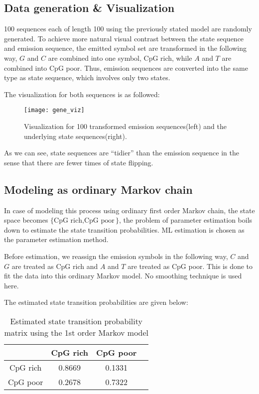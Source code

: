 \documentclass[paper=a4, fontsize=11pt]{scrartcl} %
\numberwithin{equation}{section} %
\numberwithin{figure}{section} %
\numberwithin{table}{section} %
\begin{document}
\subsection {Data generation \& Visualization}

100 sequences each of length 100 using the previously stated model are randomly generated. To achieve more natural visual contrast between the state sequence and emission sequence, the emitted symbol set are transformed in the following way, $G$ and $C$ are combined into one symbol, CpG rich, while $A$ and $T$ are combined into CpG poor. Thus, emission sequences are converted into the same type as state sequence, which involves only two states.

The visualization for both sequences is as followed:

\begin{figure}[H]
  \center
  \texttt{[image: gene\_viz]}
  \label{fig:5.gene_viz}
  \caption {Visualization for 100 transformed emission sequences(left) and the underlying state sequences(right).}
\end{figure}

As we can see, state sequences are ``tidier'' than the emission sequence in the sense that there are fewer times of state flipping.

\subsection {Modeling as ordinary Markov chain}

In case of modeling this process using ordinary first order Markov chain, the state space becomes $\{{\text{CpG rich}, \text{CpG poor}}\}$, the problem of parameter estimation boils down to estimate the state transition probabilities. ML estimation is chosen as the  parameter estimation method. 

Before estimation, we reassign the emission symbols in the following way, $C$ and $G$ are treated as CpG rich and $A$ and $T$ are treated as CpG poor. This is done to fit the data into this ordinary Markov model. No smoothing technique is used here.

The estimated state transition probabilities are given below:

\begin{table}[H]
\caption{Estimated state transition probability matrix using the 1st order Markov model }
\centering
\begin{tabular}{c|ccc}
  & CpG rich & CpG poor  \\ \hline
  CpG rich & 0.8669 &   0.1331 \\
  CpG poor & 0.2678 &   0.7322
\end {tabular}
\end {table}
\end{document}
